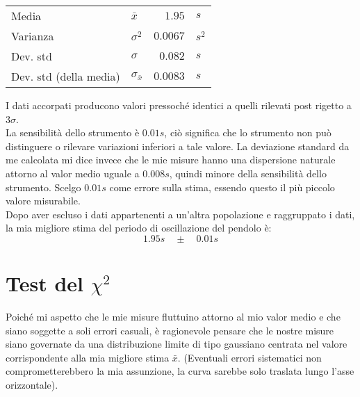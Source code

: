 \documentclass{article}
\begin{document}
	\vspace{0.8cm}
	\begin{table}[H]
		\centering
		\begin{tabular}{llrl}
			Media                       & $\bar{x}$             & $1.95$        & $s$       \\
			Varianza                    & $\sigma ^ 2$          & $0.0067$     & $s^2$  \\
			Dev. std                    & $\sigma$              & $0.082$      & $s$   \\
			Dev. std (della media)      & $\sigma_{\bar{x}}$    & $0.0083$     & $s$    
		\end{tabular}
	\end{table}
	\vspace{0.5cm}
	
	\noindent
	I dati accorpati producono valori pressoché identici a quelli rilevati post rigetto a $3\sigma$. \\
	
	
	\noindent
	La sensibilità dello strumento è $0.01s$, ciò significa che lo strumento non può distinguere o rilevare variazioni inferiori a tale valore. La deviazione standard da me calcolata mi dice invece che le mie misure hanno una dispersione naturale attorno al valor medio uguale a $0.008s$, quindi minore della sensibilità dello strumento. Scelgo $0.01s$ come errore sulla stima, essendo questo il più piccolo valore misurabile. \\
	
	
	\noindent
	Dopo aver escluso i dati appartenenti a un'altra popolazione e raggruppato i dati, la mia migliore stima del  periodo di oscillazione del pendolo è:
	\[
	1.95s \quad \pm \quad 0.01 s
	\]
	
	
	
	
	
	\newpage
	\section{Test del $\chi ^2$}
	Poiché mi aspetto che le mie misure fluttuino attorno al mio valor medio e che siano soggette a soli errori casuali, è ragionevole pensare che le nostre misure siano governate da una distribuzione limite di tipo gaussiano centrata nel valore corrispondente alla mia migliore stima $\bar{x}$. (Eventuali errori sistematici non comprometterebbero la mia assunzione, la curva sarebbe solo traslata lungo l'asse orizzontale). \\ 
	
\end{document}
